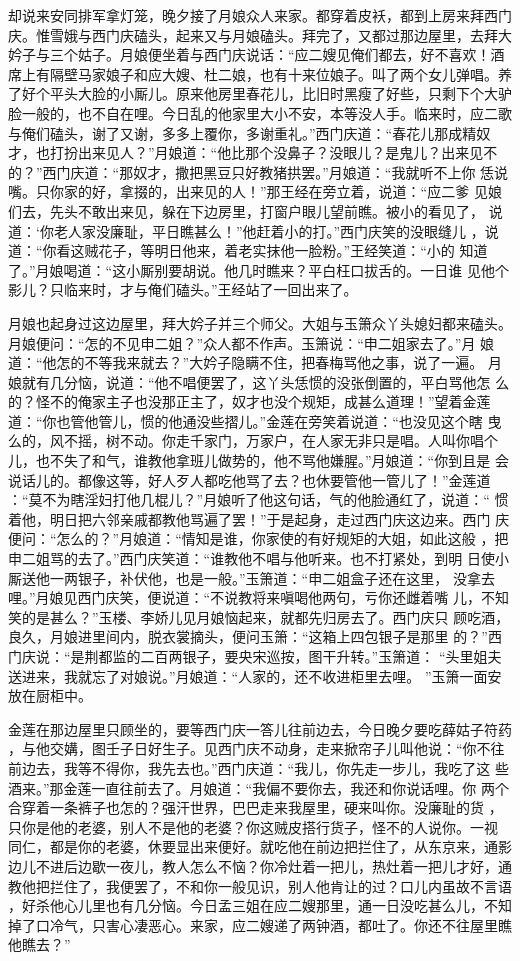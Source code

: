 却说来安同排军拿灯笼，晚夕接了月娘众人来家。都穿着皮袄，都到上房来拜西门
庆。惟雪娥与西门庆磕头，起来又与月娘磕头。拜完了，又都过那边屋里，去拜大
妗子与三个姑子。月娘便坐着与西门庆说话：“应二嫂见俺们都去，好不喜欢！酒
席上有隔壁马家娘子和应大嫂、杜二娘，也有十来位娘子。叫了两个女儿弹唱。养
了好个平头大脸的小厮儿。原来他房里春花儿，比旧时黑瘦了好些，只剩下个大驴
脸一般的，也不自在哩。今日乱的他家里大小不安，本等没人手。临来时，应二歌
与俺们磕头，谢了又谢，多多上覆你，多谢重礼。”西门庆道：“春花儿那成精奴
才，也打扮出来见人？”月娘道：“他比那个没鼻子？没眼儿？是鬼儿？出来见不
的？”西门庆道：“那奴才，撒把黑豆只好教猪拱罢。”月娘道：“我就听不上你
恁说嘴。只你家的好，拿掇的，出来见的人！”那王经在旁立着，说道：“应二爹
见娘们去，先头不敢出来见，躲在下边房里，打窗户眼儿望前瞧。被小的看见了，
说道：‘你老人家没廉耻，平日瞧甚么！”他赶着小的打。”西门庆笑的没眼缝儿
，说道：“你看这贼花子，等明日他来，着老实抹他一脸粉。”王经笑道：“小的
知道了。”月娘喝道：“这小厮别要胡说。他几时瞧来？平白枉口拔舌的。一日谁
见他个影儿？只临来时，才与俺们磕头。”王经站了一回出来了。

月娘也起身过这边屋里，拜大妗子并三个师父。大姐与玉箫众丫头媳妇都来磕头。
月娘便问：“怎的不见申二姐？”众人都不作声。玉箫说：“申二姐家去了。”月
娘道：“他怎的不等我来就去？”大妗子隐瞒不住，把春梅骂他之事，说了一遍。
月娘就有几分恼，说道：“他不唱便罢了，这丫头恁惯的没张倒置的，平白骂他怎
么的？怪不的俺家主子也没那正主了，奴才也没个规矩，成甚么道理！”望着金莲
道：“你也管他管儿，惯的他通没些摺儿。”金莲在旁笑着说道：“也没见这个瞎
曳么的，风不摇，树不动。你走千家门，万家户，在人家无非只是唱。人叫你唱个
儿，也不失了和气，谁教他拿班儿做势的，他不骂他嫌腥。”月娘道：“你到且是
会说话儿的。都像这等，好人歹人都吃他骂了去？也休要管他一管儿了！”金莲道
：“莫不为瞎淫妇打他几棍儿？”月娘听了他这句话，气的他脸通红了，说道：“
惯着他，明日把六邻亲戚都教他骂遍了罢！”于是起身，走过西门庆这边来。西门
庆便问：“怎么的？”月娘道：“情知是谁，你家使的有好规矩的大姐，如此这般
，把申二姐骂的去了。”西门庆笑道：“谁教他不唱与他听来。也不打紧处，到明
日使小厮送他一两银子，补伏他，也是一般。”玉箫道：“申二姐盒子还在这里，
没拿去哩。”月娘见西门庆笑，便说道：“不说教将来嗔喝他两句，亏你还雌着嘴
儿，不知笑的是甚么？”玉楼、李娇儿见月娘恼起来，就都先归房去了。西门庆只
顾吃酒，良久，月娘进里间内，脱衣裳摘头，便问玉箫：“这箱上四包银子是那里
的？”西门庆说：“是荆都监的二百两银子，要央宋巡按，图干升转。”玉箫道：
“头里姐夫送进来，我就忘了对娘说。”月娘道：“人家的，还不收进柜里去哩。
”玉箫一面安放在厨柜中。

金莲在那边屋里只顾坐的，要等西门庆一答儿往前边去，今日晚夕要吃薛姑子符药
，与他交媾，图壬子日好生子。见西门庆不动身，走来掀帘子儿叫他说：“你不往
前边去，我等不得你，我先去也。”西门庆道：“我儿，你先走一步儿，我吃了这
些酒来。”那金莲一直往前去了。月娘道：“我偏不要你去，我还和你说话哩。你
两个合穿着一条裤子也怎的？强汗世界，巴巴走来我屋里，硬来叫你。没廉耻的货
，只你是他的老婆，别人不是他的老婆？你这贼皮搭行货子，怪不的人说你。一视
同仁，都是你的老婆，休要显出来便好。就吃他在前边把拦住了，从东京来，通影
边儿不进后边歇一夜儿，教人怎么不恼？你冷灶着一把儿，热灶着一把儿才好，通
教他把拦住了，我便罢了，不和你一般见识，别人他肯让的过？口儿内虽故不言语
，好杀他心儿里也有几分恼。今日孟三姐在应二嫂那里，通一日没吃甚么儿，不知
掉了口冷气，只害心凄恶心。来家，应二嫂递了两钟酒，都吐了。你还不往屋里瞧
他瞧去？”

